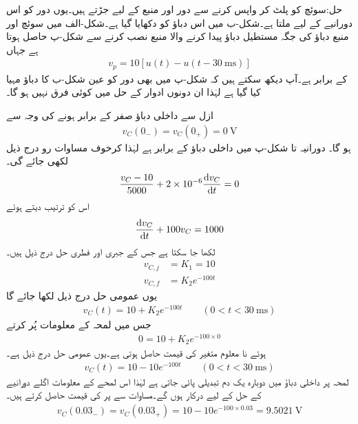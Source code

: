 حل:سوئچ کو پلٹ کر واپس کرنے سے دور اور منبع  کے لیے جڑتے ہیں۔یوں دور کو اس دورانیے کے لیے  ملتا ہے۔شکل-ب میں اس دباؤ کو دکھایا گیا ہے۔شکل-الف میں سوئچ اور منبع دباؤ کی جگہ مستطیل  دباؤ پیدا کرنے والا منبع  نصب کرنے سے شکل-پ حاصل ہوتا ہے جہاں
\begin{align*}
v_p=10\left[u(t)-u(t-\SI{30}{\milli\second})\right]
\end{align*}
کے برابر ہے۔آپ دیکھ سکتے ہیں کہ شکل-پ میں بھی دور کو عین شکل-ب کا دباؤ مہیا کیا گیا ہے لہٰذا ان دونوں ادوار کے حل میں کوئی فرق نہیں ہو گا۔

ازل سے داخلی دباؤ صفر کے برابر ہونے کی وجہ سے 
\begin{align*}
v_C(0_-)=v_C(0_+)=\SI{0}{\volt}
\end{align*}
ہو گا۔ دورانیہ  تا شکل-پ  میں داخلی دباؤ  کے برابر ہے لہٰذا کرخوف مساوات رو درج ذیل لکھی جائے گی۔
\begin{align*}
\frac{v_C-10}{5000}+2\times 10^{-6}\frac{\dif v_C}{\dif t}=0
\end{align*}
اس کو ترتیب دیتے ہوئے
\begin{align*}
\frac{\dif v_C}{\dif t}+100 v_C=1000
\end{align*}
لکھا جا سکتا ہے جس کے جبری اور فطری حل درج ذیل ہیں۔
\begin{align*}
v_{C,j}&=K_1=10\\
v_{C,f}&=K_2 e^{-100t}
\end{align*}
یوں عمومی حل درج ذیل لکھا جائے گا
\begin{align*}
v_C(t)=10+K_2e^{-100t}\quad \quad (0<t<\SI{30}{\milli\second})
\end{align*}
جس میں لمحہ  کے معلومات پُر کرتے
\begin{align*}
0=10+K_2 e^{-100\times 0}
\end{align*}
ہوئے نا معلوم متغیر کی قیمت  حاصل ہوتی ہے۔یوں عمومی حل درج ذیل ہے۔
\begin{align}\label{مساوات_عارضی_مستطیل_مثال_حل_الف}
v_C(t)=10-10e^{-100t}\quad \quad (0<t<\SI{30}{\milli\second})
\end{align}
لمحہ  پر داخلی دباؤ میں دوبارہ یک دم تبدیلی پائی جاتی ہے لہٰذا اس لمحے کے معلومات اگلے دورانیے کے حل کے لیے درکار ہوں گے۔مساوات  سے  پر  کی قیمت حاصل کرتے ہیں۔
\begin{align*}
v_C(0.03_-)=v_C(0.03_+)=10-10e^{-100\times 0.03}=\SI{9.5021}{\volt}
\end{align*} 
